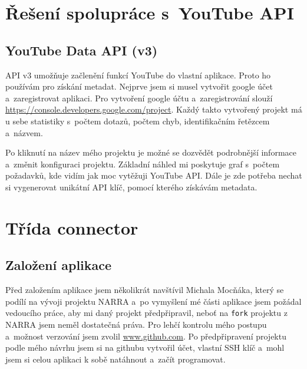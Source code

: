 \section{Řešení spolupráce s~YouTube API}
\subsection{YouTube Data API (v3)}
\par API v3\cite{apiv3} umožňuje začlenění funkcí YouTube do vlastní aplikace. Proto ho používám pro získání metadat. Nejprve jsem si musel vytvořit google účet a~zaregistrovat aplikaci. Pro vytvoření google účtu a~zaregistrování slouží \url{https://console.developers.google.com/project}\cite{googleconsole}. Každý takto vytvořený projekt má u sebe statistiky s~počtem dotazů, počtem chyb, identifikačním řetězcem a~názvem. 
\par Po kliknutí na název mého projektu je možné se dozvědět podrobnější informace a~změnit konfiguraci projektu. Základní náhled mi poskytuje graf s~počtem požadavků, kde vidím jak moc vytěžuji YouTube API\cite{apiv3}. Dále je zde potřeba nechat si vygenerovat unikátní API klíč, pomocí kterého získávám metadata.

\section{Třída connector}
\subsection{Založení aplikace}
\par Před založením aplikace jsem několikrát navštívil Michala Mocňáka, který se podílí na vývoji projektu NARRA a~po vymyšlení mé části aplikace jsem požádal vedoucího práce, aby mi daný projekt předpřipravil, neboť na \texttt{fork} projektu z NARRA jsem neměl dostatečná práva. Pro lehčí kontrolu mého postupu a~možnost verzování jsem zvolil \url{www.github.com}\cite{git}. Po předpřipravení projektu podle mého návrhu jsem si na githubu vytvořil účet, vlastní SSH klíč a~mohl jsem si celou aplikaci k sobě natáhnout a~začít programovat.

